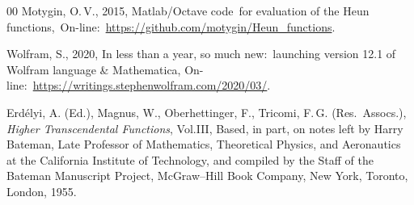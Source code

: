 \documentclass[11pt]{article}
\begin{document}
\begin{thebibliography}{00}
 Motygin, O.\,V., 2015, Matlab/Octave code~for evaluation of the Heun
functions,~\mbox{On-line}:\
\url{https://github.com/motygin/Heun_functions}.

 Wolfram, S., 2020, In less than a year, so much new:\ launching version 12.1 of Wolfram language \& Mathematica, On-line:\ \url{https://writings.stephenwolfram.com/2020/03/}.

 Erd\'{e}lyi, A. (Ed.), Magnus, W., Oberhettinger, F., 
Tricomi, F.\,G. (Res.\ Assocs.), \emph{Higher Transcendental Functions}, Vol.\;III, Based, in part, on notes left by
Harry Bateman, Late Professor of Mathematics, Theoretical Physics, and Aeronautics at the
California Institute of Technology, and compiled by the Staff of the Bateman Manuscript Project, McGraw--Hill Book Company, New
York, Toronto, London, 1955.

\end{thebibliography}
\end{document}
